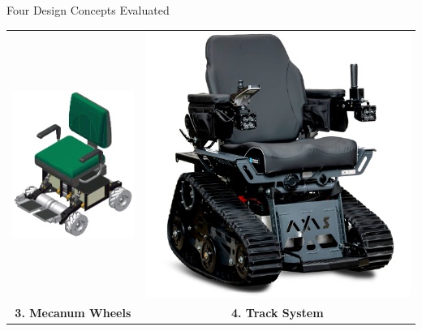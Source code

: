\documentclass[aspectratio=169]{beamer}
\begin{document}
\begin{frame}{Four Design Concepts Evaluated}
\begin{center}
\begin{tabular}{cc}
\includegraphics[height=0.25\textheight]{pdpAssets/MecanumWheelSystem.png} &
\includegraphics[height=0.25\textheight]{pdpAssets/TrackBasedSystemwithPivotMechanism.jpg} \\
\textbf{3. Mecanum Wheels} & \textbf{4. Track System} \\
\end{tabular}
\end{center}
\end{frame}
\end{document}
